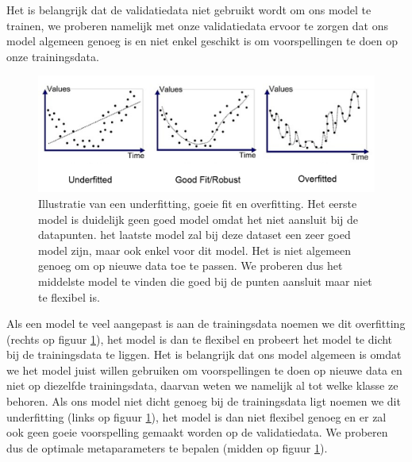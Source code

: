 \documentclass[TeamE-eindrapport]{subfiles}
\begin{document}
	Het is belangrijk dat de validatiedata niet gebruikt wordt om ons model te trainen, we proberen namelijk met onze validatiedata ervoor te zorgen dat ons model algemeen genoeg is en niet enkel geschikt is om voorspellingen te doen op onze trainingsdata. 
	
	\begin{figure}[h!]
		\centering
		\includegraphics[width=.8\textwidth]{fitting}
		\caption{Illustratie van een underfitting, goeie fit en overfitting. Het eerste  model is duidelijk geen goed model omdat het niet aansluit bij de datapunten. het laatste model zal bij deze dataset een zeer goed model zijn, maar ook enkel voor dit model. Het is niet algemeen genoeg om op nieuwe data toe te passen. We proberen dus het middelste model te vinden die goed bij de punten aansluit maar niet te flexibel is.\cite{Bhande_2018}}
		\label{fig:fitting}
	\end{figure}
	
	Als een model te veel aangepast is aan de trainingsdata noemen we dit overfitting (rechts op figuur \ref{fig:fitting}), het model is dan te flexibel en probeert het model te dicht bij de trainingsdata te liggen. Het is belangrijk dat ons model algemeen is omdat we het model juist willen gebruiken om voorspellingen te doen op nieuwe data en niet op diezelfde trainingsdata, daarvan weten we namelijk al tot welke klasse ze behoren. Als ons model niet dicht genoeg bij de trainingsdata ligt noemen we dit underfitting (links op figuur \ref{fig:fitting}), het model is dan niet flexibel genoeg en er zal ook geen goeie voorspelling gemaakt worden op de validatiedata. We proberen dus de optimale metaparameters te bepalen (midden op figuur \ref{fig:fitting}).
	
\end{document}
